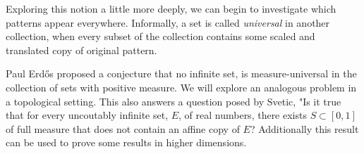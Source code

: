 Exploring this notion a little more deeply, we can begin to investigate which patterns appear everywhere.  Informally, a set is called \textit{universal} in another collection, when every subset of the collection contains some scaled and translated copy of original pattern.  

  Paul Erd\H{o}s proposed a conjecture that no infinite set, is measure-universal in  the collection of sets with positive measure.  We will explore an analogous problem in a topological setting.   This also answers a question posed by Svetic\cite{Svetic}, "Is it true that for every uncoutably infinite set, $E$, of real numbers, there exists $S \subset [0,1]$ of full measure that does not contain an affine copy of $E$?  Additionally this result can be used to prove some results in higher dimensions.  






